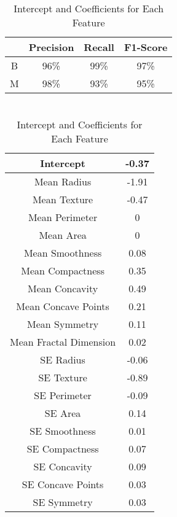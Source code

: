 \documentclass[conference]{IEEEtran}
\begin{document}
\begin{table}[h]
        \centering
        \caption{Classification Report for Testing Data}
        \begin{tabular}{c|c|c|c}
             & Precision & Recall & F1-Score\\
             \hline
             B & 96\% & 99\% & 97\%\\
             \hline
             M & 98\% & 93\% & 95\%
        \end{tabular}

       \caption{\\Intercept and Coefficients for Each Feature}
        \begin{tabular}{c|c}
             Intercept & -0.37\\
             \hline
             Mean Radius & -1.91\\
             \hline
             Mean Texture & -0.47\\
             \hline
             Mean Perimeter & 0\\
             \hline
             Mean Area & 0\\
             \hline
             Mean Smoothness & 0.08\\
             \hline
             Mean Compactness & 0.35\\
             \hline
             Mean Concavity & 0.49\\
             \hline
             Mean Concave Points & 0.21\\
             \hline
             Mean Symmetry & 0.11\\
             \hline
             Mean Fractal Dimension & 0.02\\
             \hline
             SE Radius & -0.06\\
             \hline
             SE Texture & -0.89\\
             \hline
             SE Perimeter & -0.09\\
             \hline
             SE Area & 0.14\\
             \hline
             SE Smoothness & 0.01\\
             \hline
             SE Compactness & 0.07\\
             \hline
             SE Concavity & 0.09\\
             \hline
             SE Concave Points & 0.03\\
             \hline
             SE Symmetry & 0.03\\

\end{tabular}
\end{table}
\end{document}
